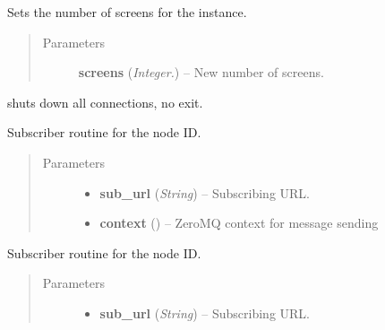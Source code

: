 \documentclass[letterpaper,10pt,english]{sphinxmanual}
\begin{document}
\begin{fulllineitems}

\begin{fulllineitems}
\label{api:swnp.SWNP.set_screens}
Sets the number of screens for the instance.
\begin{quote}\begin{description}
\item[{Parameters}] \leavevmode
\textbf{screens} (\emph{Integer.}) -- New number of screens.

\end{description}\end{quote}

\end{fulllineitems}


\begin{fulllineitems}
\label{api:swnp.SWNP.shutdown}
shuts down all connections, no exit.

\end{fulllineitems}


\begin{fulllineitems}
\label{api:swnp.SWNP.sub_routine}
Subscriber routine for the node ID.
\begin{quote}\begin{description}
\item[{Parameters}] \leavevmode\begin{itemize}
\item {} 
\textbf{sub\_url} (\emph{String}) -- Subscribing URL.

\item {} 
\textbf{context} () -- ZeroMQ context for message sending

\end{itemize}

\end{description}\end{quote}

\end{fulllineitems}


\begin{fulllineitems}
\label{api:swnp.SWNP.sub_routine_sys}
Subscriber routine for the node ID.
\begin{quote}\begin{description}
\item[{Parameters}] \leavevmode\begin{itemize}
\item {} 
\textbf{sub\_url} (\emph{String}) -- Subscribing URL.


\end{itemize}
\end{description}
\end{quote}
\end{fulllineitems}
\end{fulllineitems}
\end{document}
